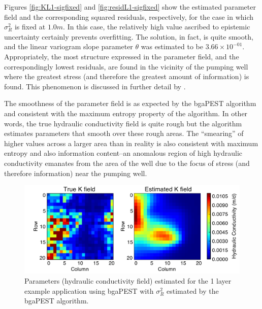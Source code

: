\documentclass[11pt,oneside,onecolumn]{usgsreport}
\begin{document}
\begin{appendix}
\begin{bibunit}
Figures \ref{fig:KL1-sigfixed} and \ref{fig:residL1-sigfixed} show
the estimated parameter field and the corresponding squared residuals,
respectively, for the case in which $\sigma_{R}^{2}$ is fixed at
$1.0m$. In this case, the relatively high value ascribed to epistemic
uncertainty certainly prevents overfitting. The solution, in fact,
is quite smooth, and the linear variogram slope parameter $\theta$
was estimated to be $3.66\times10^{-01}$. Appropriately, the most
structure expressed in the parameter field, and the correspondingly
lowest residuals, are found in the vicinity of the pumping well where
the greatest stress (and therefore the greatest amount of information)
is found. This phenomenon is discussed in further detail by \citet{FienenWRR2008}.

The smoothness of the parameter field is as expected by the bgaPEST
algorithm and consistent with the maximum entropy property of the
algorithm. In other words, the true hydraulic conductivity field is
quite rough but the algorithm estimates parameters that smooth over
these rough areas. The ``smearing'' of higher values across a larger
area than in reality is also consistent with maximum entropy and also
information content--an anomalous region of high hydraulic conductivity
emanates from the area of the well due to the focus of stress (and
therefore information) near the pumping well.

\begin{figure}[!t]
\begin{center} \includegraphics[scale=0.7]{figures/1_lay_best_pars_sigma_estimated}\end{center}

\caption{\label{fig:KL1-sigEstimated}Parameters (hydraulic conductivity field)
estimated for the 1 layer example application using bgaPEST with $\sigma_{R}^{2}$
estimated by the bgaPEST algorithm.}
\end{figure}



\end{bibunit}
\end{appendix}
\end{document}
